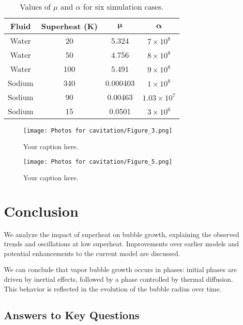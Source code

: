\documentclass[aps,pre,twocolumn,superscriptaddress,floatfix]{revtex4-2}
\begin{document}
\begin{table}[h]
\centering
\begin{tabular}{|c|c|c|c|}
\hline
\textbf{Fluid} & \textbf{Superheat (K)} & $\boldsymbol{\mu}$ & $\boldsymbol{\alpha}$ \\
\hline
Water & 20 & 5.324 & $7 \times 10^8$ \\
Water & 50 & 4.756 & $8 \times 10^8$ \\
Water & 100 & 5.491 & $9 \times 10^8$ \\
\hline
Sodium & 340 & 0.000403 & $1 \times 10^8$ \\
Sodium & 90 & 0.00463 & $1.03 \times 10^7$ \\
Sodium & 15 & 0.0501 & $3 \times 10^6$ \\
\hline
\end{tabular}
\caption{Values of $\mu$ and $\alpha$ for six simulation cases.}
\label{tab:mu_alpha_cases}
\end{table}


\begin{figure}[ht]
    \centering
    \texttt{[image: Photos for cavitation/Figure\_3.png]}
    \caption{Your caption here.}
    \label{fig:your_label}
\end{figure}
\begin{figure}[ht]
    \centering
    \texttt{[image: Photos for cavitation/Figure\_5.png]}
    \caption{Your caption here.}
    \label{fig:your_label}
\end{figure}



\section{Conclusion}

We analyze the impact of superheat on bubble growth, explaining the observed trends and oscillations at low superheat. Improvements over earlier models and potential enhancements to the current model are discussed.

We can conclude that vapor bubble growth occurs in phases: initial phases are driven by inertial effects, followed by a phase controlled by thermal diffusion. This behavior is reflected in the evolution of the bubble radius over time.

\subsection{Answers to Key Questions}
\end{document}

